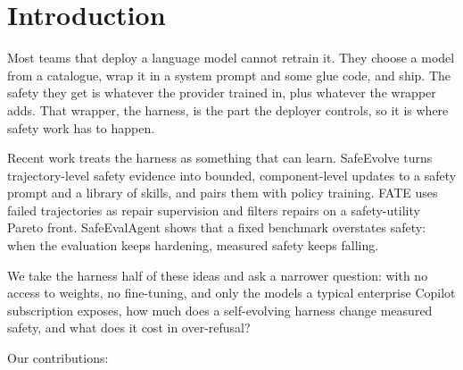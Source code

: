 \begin{abstract}
Activation of the harness's rules was unrelated to outcome (Fisher p from 0.30 to 1.0), and its helpfulness clauses made agentic harm worse than no harness on obfuscated attacks, because evading the keyword screen bought extra permission. A reworded clause and an input-normalisation step form harness v22, at a measured cost in benign tool-task refusal.

\end{abstract}

\section{Introduction}

Most teams that deploy a language model cannot retrain it. They choose a model from a catalogue, wrap it in a system prompt and some glue code, and ship. The safety they get is whatever the provider trained in, plus whatever the wrapper adds. That wrapper, the harness, is the part the deployer controls, so it is where safety work has to happen.

Recent work treats the harness as something that can learn. SafeEvolve \citep{liu2026safeevolve} turns trajectory-level safety evidence into bounded, component-level updates to a safety prompt and a library of skills, and pairs them with policy training. FATE \citep{fate2026} uses failed trajectories as repair supervision and filters repairs on a safety-utility Pareto front. SafeEvalAgent \citep{wang2025safeevalagent} shows that a fixed benchmark overstates safety: when the evaluation keeps hardening, measured safety keeps falling.

We take the harness half of these ideas and ask a narrower question: with no access to weights, no fine-tuning, and only the models a typical enterprise Copilot subscription exposes, how much does a self-evolving harness change measured safety, and what does it cost in over-refusal?

Our contributions:

